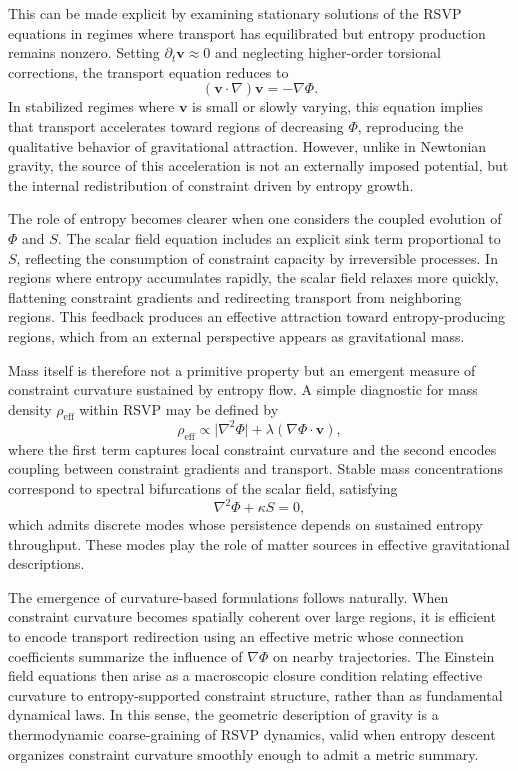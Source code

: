 \documentclass[11pt]{article}
\begin{document}
This can be made explicit by examining stationary solutions of the RSVP equations in regimes where transport has equilibrated but entropy production remains nonzero. Setting $\partial_t \mathbf{v} \approx 0$ and neglecting higher-order torsional corrections, the transport equation reduces to
\begin{equation}
(\mathbf{v} \cdot \nabla)\mathbf{v} = -\nabla \Phi.
\end{equation}
In stabilized regimes where $\mathbf{v}$ is small or slowly varying, this equation implies that transport accelerates toward regions of decreasing $\Phi$, reproducing the qualitative behavior of gravitational attraction. However, unlike in Newtonian gravity, the source of this acceleration is not an externally imposed potential, but the internal redistribution of constraint driven by entropy growth.

The role of entropy becomes clearer when one considers the coupled evolution of $\Phi$ and $S$. The scalar field equation includes an explicit sink term proportional to $S$, reflecting the consumption of constraint capacity by irreversible processes. In regions where entropy accumulates rapidly, the scalar field relaxes more quickly, flattening constraint gradients and redirecting transport from neighboring regions. This feedback produces an effective attraction toward entropy-producing regions, which from an external perspective appears as gravitational mass.

Mass itself is therefore not a primitive property but an emergent measure of constraint curvature sustained by entropy flow. A simple diagnostic for mass density $\rho_{\text{eff}}$ within RSVP may be defined by
\begin{equation}
\rho_{\text{eff}} \propto \lvert \nabla^2 \Phi \rvert + \lambda (\nabla \Phi \cdot \mathbf{v}),
\end{equation}
where the first term captures local constraint curvature and the second encodes coupling between constraint gradients and transport. Stable mass concentrations correspond to spectral bifurcations of the scalar field, satisfying
\begin{equation}
\nabla^2 \Phi + \kappa S = 0,
\end{equation}
which admits discrete modes whose persistence depends on sustained entropy throughput. These modes play the role of matter sources in effective gravitational descriptions.

The emergence of curvature-based formulations follows naturally. When constraint curvature becomes spatially coherent over large regions, it is efficient to encode transport redirection using an effective metric whose connection coefficients summarize the influence of $\nabla \Phi$ on nearby trajectories. The Einstein field equations then arise as a macroscopic closure condition relating effective curvature to entropy-supported constraint structure, rather than as fundamental dynamical laws. In this sense, the geometric description of gravity is a thermodynamic coarse-graining of RSVP dynamics, valid when entropy descent organizes constraint curvature smoothly enough to admit a metric summary.
\end{document}
